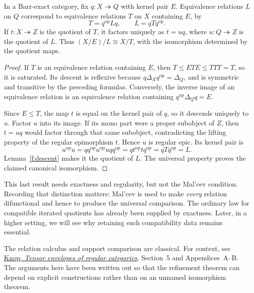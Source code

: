 \begin{corollary}\label{d:iterated-quotient}
In a Barr-exact category, fix $q:X\twoheadrightarrow Q$ with kernel
pair $E$. Equivalence relations $L$ on $Q$ correspond to equivalence
relations $T$ on $X$ containing $E$, by
\[
T=q^{\mathrm{op}}Lq,\qquad L=qTq^{\mathrm{op}}.
\]
If $t:X\twoheadrightarrow Z$ is the quotient of $T$, it factors
uniquely as $t=uq$, where $u:Q\twoheadrightarrow Z$ is the quotient
of $L$. Thus $(X/E)/L\cong X/T$, with the isomorphism determined by
the quotient maps.
\end{corollary}
\begin{proof}
If $T$ is an equivalence relation containing $E$, then
$T\leq ETE\leq TTT=T$, so it is saturated. Its descent is reflexive
because $q\Delta_Xq^{\mathrm{op}}=\Delta_Q$, and is symmetric and
transitive by the preceding formulas. Conversely, the inverse image
of an equivalence relation is an equivalence relation containing
$q^{\mathrm{op}}\Delta_Qq=E$.

Since $E\leq T$, the map $t$ is equal on the kernel pair of $q$,
so it descends uniquely to $u$. Factor $u$ into its image. If its mono
part were a proper subobject of $Z$, then $t=uq$ would factor through
that same subobject, contradicting the lifting property of the regular
epimorphism $t$. Hence $u$ is regular epic. Its kernel pair is
\[
u^{\mathrm{op}}u
=qq^{\mathrm{op}}u^{\mathrm{op}}uqq^{\mathrm{op}}
=qt^{\mathrm{op}}tq^{\mathrm{op}}=qTq^{\mathrm{op}}=L.
\]
Lemma~\ref{f:descent} makes it the quotient of $L$. The universal
property proves the claimed canonical isomorphism.
\end{proof}

This last result needs exactness and regularity, but not the Mal'cev
condition. Recording that distinction matters: Mal'cev is used to make
\emph{every} relation difunctional and hence to produce the universal
comparison. The ordinary law for compatible iterated quotients has
already been supplied by exactness. Later, in a higher setting, we
will see why retaining such compatibility data remains essential.

The relation calculus and support comparison are classical. For
context, see \href{https://arxiv.org/pdf/math/0610552}{Knop,
\emph{Tensor envelopes of regular categories}}, Section~5 and
Appendices~A--B. The arguments here have been written out so that the
refinement theorem can depend on explicit constructions rather than on
an unnamed isomorphism theorem.
